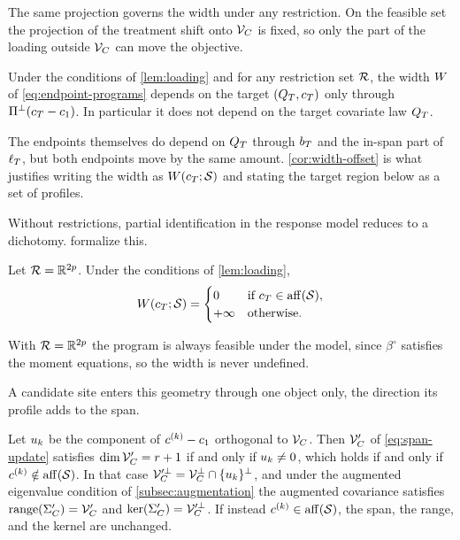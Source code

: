 The same projection governs the width under any restriction. On the
feasible set the projection of the treatment shift onto $\mathcal V_C$ is
fixed, so only the part of the loading outside $\mathcal V_C$ can move the
objective.

\begin{corollary}
\label{cor:width-offset}
Under the conditions of \cref{lem:loading} and for any restriction set
$\mathcal R$, the width $W$ of \eqref{eq:endpoint-programs} depends
on the target $(Q_T,c_T)$ only through $\Pi^\perp(c_T-c_1)$. In
particular it does not depend on the target covariate law $Q_T$.
\end{corollary}

\noindent
The endpoints themselves do depend on $Q_T$ through $b_T$ and the
in-span part of $\ell_T$, but both endpoints move by the same amount.
\cref{cor:width-offset} is what justifies writing the width as
$W(c_T;\mathcal S)$ and stating the target region below as a set of
profiles.

Without restrictions, partial identification in the response model
reduces to a dichotomy. \citet{boyarsky2026} formalize this.

\begin{proposition}
\label{prop:dichotomy}
Let $\mathcal R=\mathbb{R}^{2p}$. Under the conditions of \cref{lem:loading},
\begin{equation}
  W(c_T;\mathcal S)=
  \begin{cases}
    0 & \text{if } c_T\in\operatorname{aff}(\mathcal S),\\
    +\infty & \text{otherwise.}
  \end{cases}
  \label{eq:dichotomy}
\end{equation}
\end{proposition}

\noindent
With $\mathcal R=\mathbb{R}^{2p}$ the program is always feasible under the model,
since $\beta^\circ$ satisfies the moment equations, so the width is never
undefined.

A candidate site enters this geometry through one object only, the
direction its profile adds to the span.

\begin{proposition}
\label{prop:hull}
Let $u_{k}$ be the component of $c^{(k)}-c_1$ orthogonal to
$\mathcal V_C$. Then $\mathcal V_C'$ of \eqref{eq:span-update} satisfies
$\dim\mathcal V_C'=r+1$ if and only if $u_{k}\neq0$, which holds if and
only if $c^{(k)}\notin\operatorname{aff}(\mathcal S)$. In that case
$\mathcal V_C'^{\perp}=\mathcal V_C^\perp\cap\{u_{k}\}^\perp$, and under the
augmented eigenvalue condition of \cref{subsec:augmentation} the
augmented covariance satisfies $\operatorname{range}(\Sigma_C')=\mathcal V_C'$ and
$\operatorname{ker}(\Sigma_C')=\mathcal V_C'^\perp$. If instead
$c^{(k)}\in\operatorname{aff}(\mathcal S)$, the span, the range, and the kernel are
unchanged.
\end{proposition}

